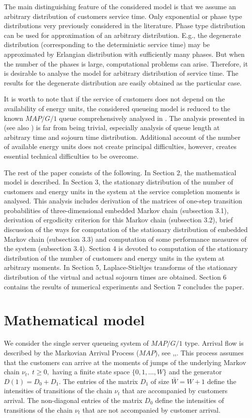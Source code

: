 \documentclass[12pt, a4paper]{article}
\begin{document}
The main distinguishing feature of the considered model is that we assume an arbitrary distribution of customers service time. Only exponential or phase type distributions very previously considered in the literature. Phase type distribution can be used for approximation of an arbitrary distribution. E.g., the degenerate distribution (corresponding to the deterministic service time) may be approximated by Erlangian distribution with sufficiently many phases. But when the number of the phases is large, computational problems can arise.  Therefore, it is desirable to analyse the model for arbitrary distribution of service time. The results for the degenerate distribution are easily obtained as the particular case.

It is worth to note that if the service of customers does not depend on the availability of energy units, the considered queueing model is reduced to the known $MAP/G/1$ queue comprehensively analysed in \cite{luk}. The analysis presented in \cite{luk} (see also \cite{dkv}) is far from being trivial, especially analysis of queue length at arbitrary time and sojourn time distribution. Additional account of the number of available energy units does not create principal difficulties, however, creates essential technical difficulties to be overcome.

The rest of the paper consists of the following. In Section 2, the mathematical model is described.  In Section 3, the stationary distribution of the number of customers and energy units in the system at the service completion moments is analysed. This analysis includes derivation of the matrices of one-step transition probabilities of three-dimensional embedded Markov chain (subsection 3.1), derivation of ergodicity criterion for this Markov chain (subsection 3.2), brief discussion of the ways for computation of the stationary distribution of embedded Markov chain (subsection 3.3) and computation of some performance measures of the system (subsection 3.4). Section 4 is devoted to computation of the stationary distribution of the number of customers and energy units in the system at arbitrary moments. In Section 5, Laplace-Stieltjes transforms of the stationary distribution of the virtual and actual sojourn times are obtained. Section 6 contains the results of numerical experiments and Section 7 concludes the paper.



\section{Mathematical model}
We consider the single server queueing system of $MAP/G/1$ type. Arrival flow is described by the Markovian Arrival Process ($MAP$), see \cite{chak},\cite{luk},\cite{vd}. This process assumes that the customers can arrive at the moments of jumps of the underlying Markov chain $\nu_t,\; t \ge 0,$ having a finite state space $\{0,1,\dots,W\}$ and the generator $D(1)=D_0+D_1.$
The entries of the matrix $D_1$ of size $\bar W=W+1$ define the intensities of transitions of the chain $\nu_t$ that are accompanied by customers arrival. The non-diagonal entries of the matrix $D_0$  define the intensities of transitions of the chain $\nu_t$ that are not accompanied by customer arrival.
\end{document}

